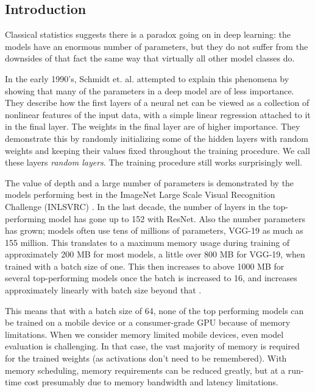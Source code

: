 \documentclass[]{article}
\begin{document}
\begin{multicols}{2}
	\section{Introduction}\label{introduction}
	Classical statistics suggests there is a paradox going on in deep learning: the models have an enormous number of parameters, but they do not suffer from the downsides of that fact the same way that virtually all other model classes do.
	
	In the early 1990's, Schmidt et. al. \cite{Schmidt_Kraaijveld_Duin} attempted to explain this phenomena by showing that many of the parameters in a deep model are of less importance. They describe how the first layers of a neural net can be viewed as a collection of nonlinear features of the input data, with a simple linear regression attached to it in the final layer. The weights in the final layer are of higher importance. They demonstrate this by randomly initializing some of the hidden layers with random weights and keeping their values fixed throughout the training procedure. We call these layers \emph{random layers}. The training procedure still works surprisingly well.
	
	The value of depth and a large number of parameters is demonstrated by the models performing best in the ImageNet Large Scale Visual Recognition Challenge (INLSVRC) \cite{DBLP:journals/corr/CanzianiPC16}. In the last decade, the number of layers in the top-performing model has gone up to 152 with ResNet. Also the number parameters has grown; models often use tens of millions of parameters, VGG-19 as much as 155 million. This translates to a maximum memory usage during training of approximately 200 MB for most models, a little over 800 MB for VGG-19, when trained with a batch size of one. This then increases to above 1000 MB for several top-performing models once the batch is increased to 16, and increases approximately linearly with batch size beyond that \cite{DBLP:journals/corr/CanzianiPC16}.
	
	This means that with a batch size of 64, none of the top performing models can be trained on a mobile device or a consumer-grade GPU because of memory limitations. When we consider memory limited mobile devices, even model evaluation is challenging. In that case, the vast majority of memory is required for the trained weights (as activations don't need to be remembered). With memory scheduling, memory requirements can be reduced greatly, but at a run-time cost \cite{Li_Shen_Dou_Ni_Xu_Yang_Wang_Niu_2019} presumably due to memory bandwidth and latency limitations.
	

\end{multicols}
\end{document}
